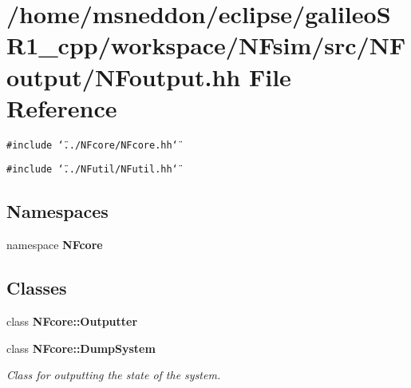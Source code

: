 \section{/home/msneddon/eclipse/galileoSR1\_\-cpp/workspace/NFsim/src/NFoutput/NFoutput.hh File Reference}
\label{NFoutput_8hh}


{\tt \#include \char`\"{}../NFcore/NFcore.hh\char`\"{}}\par
{\tt \#include \char`\"{}../NFutil/NFutil.hh\char`\"{}}\par
\subsection*{Namespaces}
\begin{CompactItemize}
\item 
namespace {\bf NFcore}
\end{CompactItemize}
\subsection*{Classes}
\begin{CompactItemize}
\item 
class {\bf NFcore::Outputter}
\item 
class {\bf NFcore::DumpSystem}
\begin{CompactList}\small\item\em Class for outputting the state of the system. \item\end{CompactList}\end{CompactItemize}
